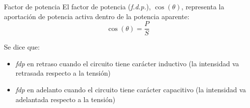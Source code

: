 \documentclass[aspectratio=169, usenames,svgnames,dvipsnames]{beamer}
\begin{document}
\begin{frame}{Factor de potencia}
    El factor de potencia (\textit{f.d.p.}), \(\cos(\theta)\), representa la aportación de potencia activa dentro de la potencia aparente:
    \[
        \cos (\theta)=\dfrac{P}{S}
    \]

    Se dice que:
	\begin{itemize}
		\item \textit{fdp} \alert{en retraso} cuando el circuito tiene carácter inductivo (la intensidad va retrasada respecto a la tensión)

        \vspace{2mm}
		\item \textit{fdp} \alert{en adelanto} cuando el circuito tiene carácter capacitivo (la intensidad va adelantada respecto a la tensión)
	\end{itemize}	
\end{frame}

\end{document}
